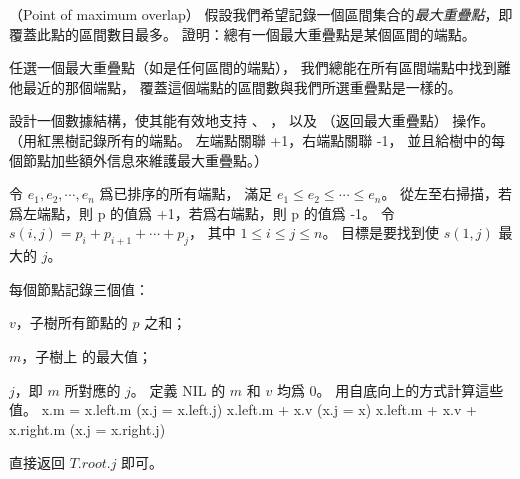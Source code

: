 \startPROBLEM
（Point of maximum overlap）
假設我們希望記錄一個區間集合的\emph{最大重疊點}，即覆蓋此點的區間數目最多。
\startigBase[a]\startitem
證明：總有一個最大重疊點是某個區間的端點。
\stopitem\stopigBase

\startANSWER
任選一個最大重疊點（如是任何區間的端點），
我們總能在所有區間端點中找到離他最近的那個端點，
覆蓋這個端點的區間數與我們所選重疊點是一樣的。
\stopANSWER

\startigBase[continue]\startitem
設計一個數據結構，使其能有效地支持 、 ，
以及  （返回最大重疊點） 操作。
（\hint 用紅黑樹記錄所有的端點。
左端點關聯 +1，右端點關聯 -1，
並且給樹中的每個節點加些額外信息來維護最大重疊點。）
\stopitem\stopigBase

\startANSWER
令 $e_1,e_2,\cdots,e_n$ 爲已排序的所有端點，
滿足 $e_1\le e_2 \le \cdots \le e_n$。
從左至右掃描，若爲左端點，則 p 的值爲 +1，若爲右端點，則 p 的值爲 -1。
令 $s(i,j)=p_i + p_{i+1} + \cdots + p_j$，
其中 $1\le i\le j\le n$。
目標是要找到使 $s(1,j)$ 最大的 $j$。

每個節點記錄三個值：
\startigBase
\item $v$，子樹所有節點的 $p$ 之和；
\item $m$，子樹上  的最大值；
\item $j$，即 $m$ 所對應的 $j$。
\stopigBase
定義 NIL 的 $m$ 和 $v$ 均爲 0。
用自底向上的方式計算這些值。
\startformula
x.m = \startcases
\NC x.left.m	\NC (x.j = x.left.j) \NR
\NC x.left.m + x.v \NC (x.j = x) \NR
\NC x.left.m + x.v + x.right.m \NC (x.j = x.right.j) \NR
\stopcases
\stopformula

 直接返回 $T.root.j$ 即可。
\stopANSWER

\stopPROBLEM
